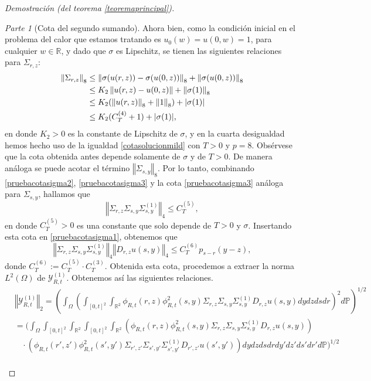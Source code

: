 \documentclass[letterpaper,twoside,12pt]{book}
\newcommand{\R}{\mathbb{R}}
\renewcommand{\P}{\mathbb{P}}
\newcommand{\1}{\mathds{1}}
\newcommand{\norm}[1]{\left\Vert #1 \right\Vert}
\theoremstyle{definition}
\theoremstyle{definition}
\theoremstyle{remark}
\newtheorem{proofpart}{Parte}
\theoremstyle{definition}
\theoremstyle{definition}
\theoremstyle{definition}
\theoremstyle{definition}
\theoremstyle{definition}
\begin{document}
\begin{proof}[Demostración (del teorema \ref{teoremaprincipal})]
\begin{proofpart}[Cota del segundo sumando]
Ahora bien, como la condición inicial en el problema del calor que estamos tratando es $u_0(w)=u(0,w)=1$, para cualquier $w\in \R$, y dado que $\sigma$ es Lipschitz,  se tienen las siguientes relaciones para $\Sigma_{r,z}$:
\begin{align}
      \norm{\Sigma_{r,z}}_8&\leq\norm{\sigma(u(r,z))-\sigma(u(0,z))}_8+\norm{\sigma(u(0,z))}_8\notag\\
      &\leq K_2\norm{u(r,z)-u(0,z)}+\norm{\sigma(1)}_8\notag\\
      &\leq K_2(\norm{u(r,z)}_8+\norm{1}_8)+|\sigma(1)|\notag\\
      &\leq K_2(C_{T}^{(4)}+1)+|\sigma(1)|\label{pruebacotasigma3},
\end{align}
en donde $K_2>0$ es la constante de Lipschitz de $\sigma$, y en la cuarta desigualdad hemos hecho uso de la igualdad \eqref{cotasolucionmild} con $T>0$ y $p=8$. Obsérvese que la cota obtenida antes depende solamente de $\sigma$ y de $T>0$. De manera análoga se puede acotar el término $\norm{\Sigma_{s,y}}_8$. Por lo tanto, combinando \eqref{pruebacotasigma2}, \eqref{pruebacotasigma3} y la cota \eqref{pruebacotasigma3} análoga para $\Sigma_{s,y}$, hallamos que 
\begin{equation}\label{pruebacotasigma4.5}
   \norm{\Sigma_{r,z}\Sigma_{s,y}\Sigma_{s,y}^{(1)}}_4\leq C_{T}^{(5)},
\end{equation} 
en donde $C^{(5)}_T>0$ es una constante que solo depende de $T>0$ y $\sigma$. Insertando esta cota en \eqref{pruebacotasigma1}, obtenemos que 
\begin{equation}\label{pruebacotasigma4}
   \norm{\Sigma_{r,z}\Sigma_{s,y}\Sigma_{s,y}^{(1)}}_4\norm{D_{r,z}u(s,y)}_4\leq C_{T}^{(6)}p_{s-r}(y-z),
\end{equation}
 donde $C_T^{(6)}:=C_T^{(5)}\cdot C_T^{(3)}$. Obtenida esta cota, procedemos a extraer la norma $L^{2}(\Omega)$ de $\mathcal{Y}_{R,t}^{(1)}$. Obtenemos así las siguientes relaciones.
 \begin{align*}
   &\norm{\mathcal{Y}_{R,t}^{(1)}}_2=\left(\int_\Omega \left(\int_{[0,t]^2}\int_{\R^2}\phi_{R,t}(r,z)\phi_{R,t}^2(s,y)\Sigma_{r,z}\Sigma_{s,y}\Sigma^{(1)}_{s,y}D_{r,z}u(s,y)dy dz ds dr\right)^2d\P\right)^{1/2}\\
   &=\Bigg(\int_\Omega\int_{[0,t]^2}\int_{\R^2}\int_{[0,t]^2}\int_{\R^2}\left(\phi_{R,t}(r,z)\phi_{R,t}^2(s,y)\Sigma_{r,z}\Sigma_{s,y}\Sigma^{(1)}_{s,y}D_{r,z}u(s,y)\right)\\
   &\ \ \ \ \cdot \left(\phi_{R,t}(r',z')\phi_{R,t}^2(s',y')\Sigma_{r',z'}\Sigma_{s',y'}\Sigma^{(1)}_{s',y'}D_{r',z'}u(s',y')\right)dy dz ds dr dy' dz'ds'dr'd\P\Bigg)^{1/2}\\

\end{align*}
\end{proofpart}
\end{proof}
\end{document}
